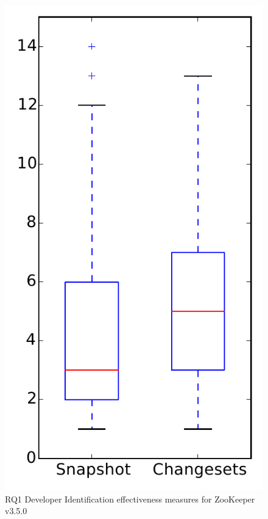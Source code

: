 
\begin{figure}
\centering
\includegraphics[height=0.4\textheight]{figures/dit/rq1_zookeeper}
\caption{RQ1 Developer Identification effectiveness measures for ZooKeeper v3.5.0}
\label{fig:dit:rq1:zookeeper}
\end{figure}
